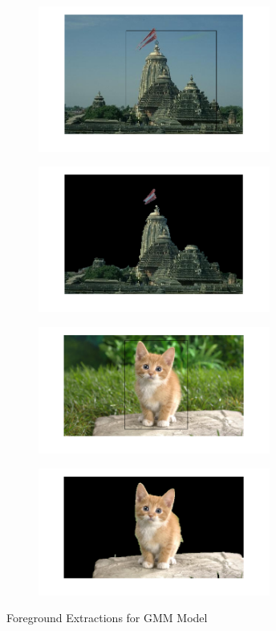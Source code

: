 \documentclass[a4paper]{article}
\begin{document}
\begin{figure}[h]
\begin{subfigure}{.5\textwidth}
  \centering
  \includegraphics[width = 3in]{temple_in}
  \label{fig:sfig2}
\end{subfigure}
\begin{subfigure}{.5\textwidth}
  \centering
  \includegraphics[width = 3in]{temple_out}
  \label{fig:sfig2}
\end{subfigure}

\begin{subfigure}{.5\textwidth}
  \centering
  \includegraphics[width = 3in]{cat_in}
  \label{fig:sfig2}
\end{subfigure}
\begin{subfigure}{.5\textwidth}
  \centering
  \includegraphics[width = 3in]{cat_out}
  \label{fig:sfig2}
\end{subfigure}



\caption{Foreground Extractions for GMM Model}
\end{figure}
\end{document}
